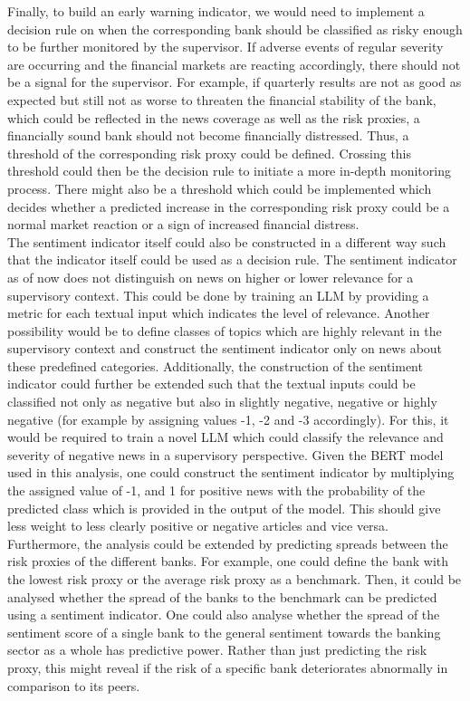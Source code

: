 Finally, to build an early warning indicator, we would need to implement a decision rule on when the corresponding bank should be classified as risky enough to be further monitored by the supervisor. If adverse events of regular severity are occurring and the financial markets are reacting accordingly, there should not be a signal for the supervisor. For example, if quarterly results are not as good as expected but still not as worse to threaten the financial stability of the bank, which could be reflected in the news coverage as well as the risk proxies, a financially sound bank should not become financially distressed. Thus, a threshold of the corresponding risk proxy could be defined. Crossing this threshold could then be the decision rule to initiate a more in-depth monitoring process. There might also be a threshold which could be implemented which decides whether a predicted increase in the corresponding risk proxy could be a normal market reaction or a sign of increased financial distress. \\

The sentiment indicator itself could also be constructed in a different way such that the indicator itself could be used as a decision rule. The sentiment indicator as of now does not distinguish on news on higher or lower relevance for a supervisory context. This could be done by training an LLM by providing a metric for each textual input which indicates the level of relevance. Another possibility would be to define classes of topics which are highly relevant in the supervisory context and construct the sentiment indicator only on news about these predefined categories. Additionally, the construction of the sentiment indicator could further be extended such that the textual inputs could be classified not only as negative but also in slightly negative, negative or highly negative (for example by assigning values -1, -2 and -3 accordingly). For this, it would be required to train a novel LLM which could classify the relevance and severity of negative news in a supervisory perspective. Given the BERT model used in this analysis, one could construct the sentiment indicator by multiplying the assigned value of -1, and 1 for positive news with the probability of the predicted class which is provided in the output of the model. This should give less weight to less clearly positive or negative articles and vice versa. \\

Furthermore, the analysis could be extended by predicting spreads between the risk proxies of the different banks. For example, one could define the bank with the lowest risk proxy or the average risk proxy as a benchmark. Then, it could be analysed whether the spread of the banks to the benchmark can be predicted using a sentiment indicator. One could also analyse whether the spread of the sentiment score of a single bank to the general sentiment towards the banking sector as a whole has predictive power. Rather than just predicting the risk proxy, this might reveal if the risk of a specific bank deteriorates abnormally in comparison to its peers. \\

